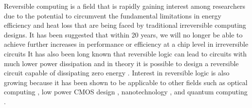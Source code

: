 Reversible computing is a field that is rapidly gaining interest among researchers due 
to the potential to circumvent the fundamental limitations in energy efficiency and heat 
loss that are being faced by traditional irreversible computing designs. It has been 
suggested that within 20 years, we will no longer be able to achieve further increases in 
performance or efficiency at a chip level in irreversible circuits \cite{Frank2005} It has 
also been long known that reversible logic can lead to circuits with much lower power 
dissipation \cite{Landauer61} and in theory it is possible to design a reversible 
circuit capable of dissipating zero energy \cite{Bennett73}. Interest in reversible logic 
is also growing because it has been shown to be applicable to other fields such as 
optical computing \cite{Picton91}, low power CMOS design \cite{Athas94}, 
nanotechnology \cite{Merkle1993}, and quantum computing \cite{AlRabadi2004}.